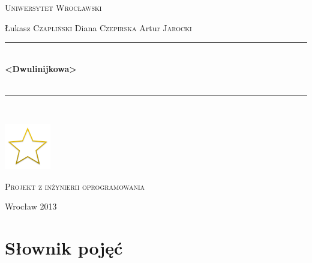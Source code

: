 \documentclass[11pt,wide]{mwart}
\newcommand{\HRule}{\rule{\linewidth}{0.5mm}}
\begin{document}
\begin{titlepage}
  \begin{center}

    \textsc{\LARGE Uniwersytet Wrocławski}\\[1.5cm]


    \vspace{3cm}

    \begin{minipage}{\textwidth}
      \begin{center} \Large
        Łukasz \textsc{Czapliński}
        Diana \textsc{Czepirska}
        Artur \textsc{Jarocki}
      \end{center}
    \end{minipage}

    \vspace{0.5cm}



    \HRule \\[0.4cm]
    { \Huge \bfseries <Dwulinijkowa>\\<nazwa projektu>  \\[0.4cm] }

    \HRule \\[1.5cm]


    \vspace{1cm}

    \includegraphics[width=0.15\textwidth]{./non-starred.png}~\\[1cm]
    
    \vfill
    
    \textsc{\Large Projekt z inżynierii oprogramowania}\\[0.5cm]

    \vspace{1cm}

    {\large Wrocław 2013}

  \end{center}
\end{titlepage}
\section{\Large Słownik pojęć}
\begin{multicols}{2}
  
\end{multicols}
\end{document}
